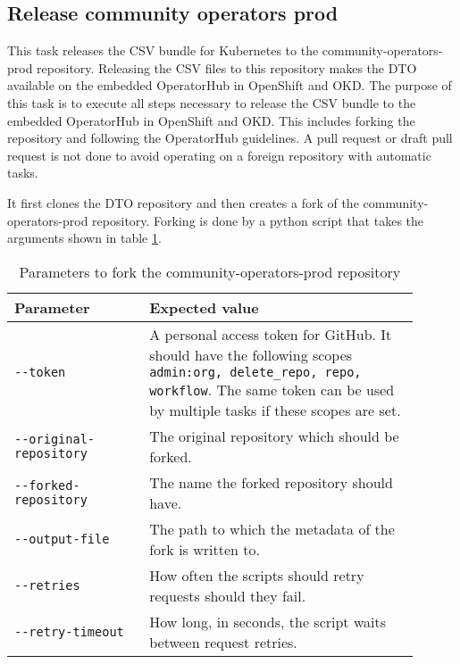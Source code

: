 \subsection{Release community operators prod}\label{subsec:release-community-operators-prod}

This task releases the CSV bundle for Kubernetes to the community-operators-prod repository.
Releasing the CSV files to this repository makes the DTO available on the embedded OperatorHub in OpenShift and OKD.
The purpose of this task is to execute all steps necessary to release the CSV bundle to the embedded OperatorHub in OpenShift and OKD.
This includes forking the repository and following the OperatorHub guidelines.
A pull request or draft pull request is not done to avoid operating on a foreign repository with automatic tasks.

It first clones the DTO repository and then creates a fork of the community-operators-prod repository.
Forking is done by a python script that takes the arguments shown in table \ref{tab:parameters-to-fork-the-community-operators-prod-repository}.

\begin{table}[h]
    \centering
    \caption{Parameters to fork the community-operators-prod repository}
    \label{tab:parameters-to-fork-the-community-operators-prod-repository}
    \begin{tabular}{p{0.3\linewidth}|p{0.6\linewidth}}
        Parameter & Expected value \\
        \hline
        \verb|--token| & A personal access token for GitHub.
            It should have the following scopes \verb|admin:org, delete_repo, repo, workflow|.
            The same token can be used by multiple tasks if these scopes are set. \\
        \verb|--original-repository| & The original repository which should be forked. \\
        \verb|--forked-repository| & The name the forked repository should have. \\
        \verb|--output-file| & The path to which the metadata of the fork is written to. \\
        \verb|--retries| & How often the scripts should retry requests should they fail. \\
        \verb|--retry-timeout| & How long, in seconds, the script waits between request retries. \\
    \end{tabular}
\end{table}

